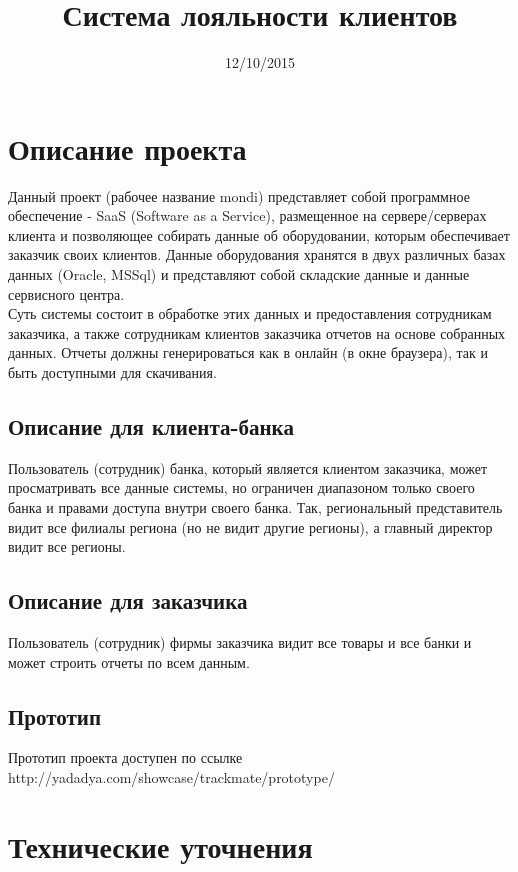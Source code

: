 \documentclass[DIV=calc, paper=a4, fontsize=11pt]{scrartcl} %
\title{Система лояльности клиентов}
\date{12/10/2015}
\begin{document}
\maketitle

\section{Описание проекта}

Данный проект (рабочее название mondi) представляет собой программное обеспечение - SaaS (Software as a Service), размещенное на сервере/серверах клиента и позволяющее собирать данные об оборудовании, которым обеспечивает заказчик своих клиентов. Данные оборудования хранятся в двух различных базах данных (Oracle, MSSql) и представляют собой складские данные и данные сервисного центра.
\\[0.5cm]
Суть системы состоит в обработке этих данных и предоставления сотрудникам заказчика, а также сотрудникам клиентов заказчика отчетов на основе собранных данных. Отчеты должны генерироваться как в онлайн (в окне браузера), так и быть доступными для скачивания.

\subsection{Описание для клиента-банка}
Пользователь (сотрудник) банка, который является клиентом заказчика, может просматривать все данные системы, но ограничен диапазоном только своего банка и правами доступа внутри своего банка. Так, региональный представитель видит все филиалы региона (но не видит другие регионы), а главный директор видит все регионы.

\subsection{Описание для заказчика}
Пользователь (сотрудник) фирмы заказчика видит все товары и все банки и может строить отчеты по всем данным.

\subsection{Прототип}
Прототип проекта доступен по ссылке http://yadadya.com/showcase/trackmate/prototype/

\section{Технические уточнения}
\end{document}
